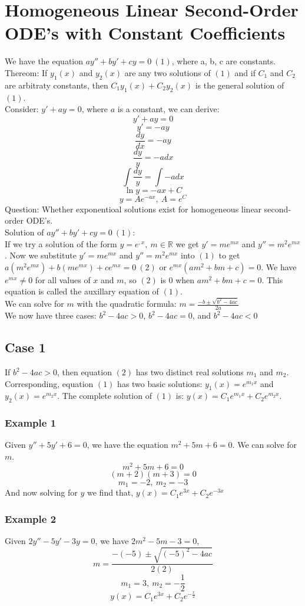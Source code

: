 \documentclass{article}
\begin{document}
\section{Homogeneous Linear Second-Order ODE's with Constant Coefficients}

We have the equation $ay'' + by' + cy = 0~(1)$, where a, b, c are constants.
\\
Thereom: If $y_1(x)$ and $y_2(x)$ are any two solutions of 
$(1)$ and if $C_1$ and $C_2$ are arbitraty constants, then
$C_1y_1(x) + C_2y_2(x)$ is the general solution of $(1)$.
\\
Consider: $y' + ay = 0$, where $a$ is a constant, we can derive:
$$y'+ ay = 0$$
$$y' = -ay$$
$$\frac{dy}{dx} = -ay$$
$$\frac{dy}{y} = -adx$$
$$\int{\frac{dy}{y}} = \int{-adx}$$
$$\ln{y} = -ax + C$$
$$y = Ae^{-ax},~A = e^C$$
Question: Whether exponentioal solutions exist for homogeneous linear
second-order ODE's.
\\
Solution of $ay'' + by' + cy = 0~(1)$:
\\
If we try a solution of the form $y=e^{,x},~m\in\mathbb{R}$ we get
$y' = me^{mx}$ and $y'' = m^2e^{mx}$.  Now we substitute $y' = me^{mx}$
and $y'' = m^2e^{mx}$ into $(1)$ to get
$a(m^2e^{mx}) + b(me^{mx}) + ce^{mx} = 0~(2)$ or
$e^{mx}(am^2 + bm + c) = 0$.  We have $e^{mx} \neq 0$ for all values of
$x$ and $m$, so $(2)$ is $0$ when $am^2 + bm + c = 0$.  This equation is
called the auxillary equation of $(1)$.
\\
We can solve for $m$ with the quadratic formula: 
$m = \frac{-b \pm \sqrt{b^2 - 4ac}}{2a}$
\\
We now have three cases: $b^2 - 4ac > 0$, $b^2 - 4ac = 0$, and 
$b^2 - 4ac < 0$
\\
\subsection{Case 1}
If $b^2 - 4ac > 0$, then equation $(2)$ has two distinct real solutions $m_1$
and $m_2$.  Corresponding, equation $(1)$ has two basic solutions:
$y_1(x) = e^{m_1x}$ and $y_2(x) = e^{m_2x}$.  The complete solution of $(1)$
is: $y(x) = C_1e^{m_1x} + C_2e^{m_2x}$.

\subsubsection{Example 1}
Given $y'' + 5y' + 6 = 0$, we have the equation $m^2 + 5m + 6 = 0$.  We can
solve for $m$.
$$m^2 + 5m + 6 = 0$$
$$(m + 2)(m + 3) = 0$$
$$m_1 = -2,~m_2 = -3$$
And now solving for $y$ we find that, $y(x) = C_1e^{3x} + C_2e^{-3x}$

\subsubsection{Example 2}
Given $2y'' - 5y' -3y = 0$, we have $2m^2 - 5m - 3 = 0$,
$$m = \frac{-(-5) \pm \sqrt{(-5)^2 - 4ac}}{2(2)}$$
$$m_1 = 3,~m_2 = -\frac{1}{2}$$
$$y(x) = C_1e^{3x} + C_2e^{-\frac{x}{2}}$$
\end{document}
